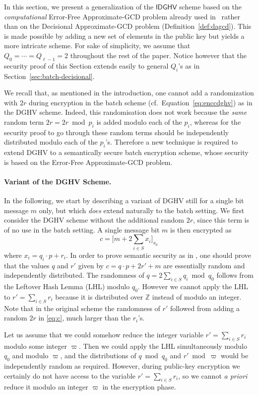 \documentclass{llncs}
\newcommand*{\CDGHV}{\ensuremath{\mathsf{IDGHV}}}
\begin{document}
In this section, we present a generalization of the $\CDGHV$ scheme based on 
the \emph{computational} Error-Free Approximate-GCD problem already used 
in~\cite{vDGHV2010,CMNT2011,CNT2012} rather than on the Decisional 
Approximate-GCD problem (Definition~\ref{def:dagcd}). This is made possible 
by adding a new set of elements in the public key but yields a more intricate 
scheme. For sake of simplicity, we assume that $Q_0=\cdots=Q_{\ell-1}=2$ 
throughout the rest of the paper. Notice however that the security proof of 
this Section extends easily to general $Q_i$'s as in Section~\ref{sec:batch-decisional}.

We recall that, as mentioned in the introduction, one cannot add a
randomization with $2r$ during encryption in the batch scheme (cf.~Equation~\eqref{eq:enccdghv}) as in the DGHV scheme. Indeed, this randomisation does not work because the \emph{same} random term $2r=2r \bmod p_i$ is added
modulo each of the $p_i$, whereas for the security proof to go through
these random terms should be independently distributed modulo each of the
$p_i$'s. Therefore a new technique is required to extend DGHV to
a semantically secure batch encryption scheme, whose security is based on the Error-Free Approximate-GCD problem.

\paragraph{Variant of the DGHV Scheme.} In the following, we start by describing a variant of DGHV still for a
single bit message $m$ only, but which \emph{does} extend naturally to the
batch setting. We first consider the DGHV scheme without the additional
random $2r$, since this term is of no use in the batch setting. A single
message bit $m$ is then encrypted as
\[
    c = \Big[m + 2\sum\limits_{i\in S} x_i\Big]_{x_0}
\]
where $x_i=q_i \cdot p+r_i$. In order to prove semantic security as in
\cite{vDGHV2010}, one should prove that the values $q$ and $r'$ given by
$c=q \cdot p+2r'+m$ are essentially random and independently distributed.
The randomness of $q=2\sum_{i \in S} q_i \bmod q_0$ follows from the
Leftover Hash Lemma (LHL) modulo $q_0$. However we cannot apply the LHL
to $r'=\sum_{i \in S} r_i$ because it is distributed over ${\mathbb Z}$
instead of modulo an integer. Note that in the original scheme the
randomness of $r'$ followed from adding a random $2r$ in \eqref{eq:c},
much larger than the $r_i$'s.

Let us assume that we could somehow reduce the integer variable
$r'=\sum_{i \in S} r_i$ modulo some integer $\varpi$. Then we could apply
the LHL simultaneously modulo $q_0$ and modulo $\varpi$, and the
distributions of $q \bmod q_0$ and $r' \bmod \varpi$ would be
independently random as required. However, during public-key encryption
we certainly do not have access to the variable $r'=\sum_{i \in S} r_i$,
so we cannot \emph{a priori} reduce it modulo an integer $\varpi$ in the
encryption phase.
\end{document}
